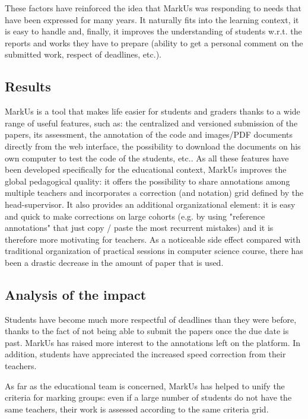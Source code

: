 \documentclass[twocolumn,10pt]{asme2e}
\begin{document}
These factors have reinforced the idea that MarkUs was responding to needs that have been expressed for many years. It naturally fits into the learning context, it is easy to handle and, finally, it improves the understanding of students w.r.t. the reports and works they have to prepare (ability to get a personal comment on the submitted work, respect of deadlines, etc.).

\subsection*{Results}

MarkUs is a tool that makes life easier for students and graders thanks to a wide range of useful features, such as: the centralized and versioned submission of the papers, its assessment, the annotation of the code and images/PDF documents directly from the web interface, the possibility to download the documents on his own computer to test the code of the students, etc.. As all these  features have been developed specifically for the educational context, MarkUs improves the global pedagogical quality: it offers the possibility to share annotations among multiple teachers and incorporates a correction (and notation) grid defined by the head-supervisor. It also provides an additional organizational element: it is easy and quick to make corrections on large cohorts (e.g. by using "reference annotations" that just copy / paste the most recurrent mistakes) and it is therefore more motivating for teachers. As a noticeable side effect compared with traditional organization of practical sessions in computer science course, there has been a drastic decrease in the amount of paper that is used. 

\subsection*{Analysis of the impact}

Students have become much more respectful of deadlines than they were before, thanks to the fact of not being able to submit the papers once the due date is past. MarkUs has raised more interest to the annotations left on the platform. In addition, students have appreciated the increased speed correction from their teachers. 

As far as the educational team is concerned, MarkUs has helped to unify the criteria for marking groups: even if a large number of students do not have the same teachers, their work is assessed according to the same criteria grid. 
\end{document}
